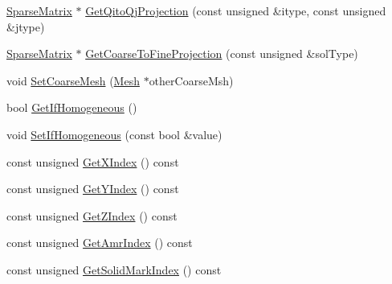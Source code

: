\begin{DoxyCompactItemize}
\item 
\mbox{\hyperlink{classfemus_1_1_sparse_matrix}{Sparse\+Matrix}} $\ast$ \mbox{\hyperlink{classfemus_1_1_mesh_a22a9673979ad78c09d562d9bb413cdde}{Get\+Qito\+Qj\+Projection}} (const unsigned \&itype, const unsigned \&jtype)
\item 
\mbox{\hyperlink{classfemus_1_1_sparse_matrix}{Sparse\+Matrix}} $\ast$ \mbox{\hyperlink{classfemus_1_1_mesh_adbe2f3cd24a35f80d8cd5adb2f5b82ac}{Get\+Coarse\+To\+Fine\+Projection}} (const unsigned \&sol\+Type)
\item 
void \mbox{\hyperlink{classfemus_1_1_mesh_a2a8172f3b7dff055b8a18fd093da3b74}{Set\+Coarse\+Mesh}} (\mbox{\hyperlink{classfemus_1_1_mesh}{Mesh}} $\ast$other\+Coarse\+Msh)
\item 
bool \mbox{\hyperlink{classfemus_1_1_mesh_abb0857c7d1bed5fa1a0ab54b090d4a00}{Get\+If\+Homogeneous}} ()
\item 
void \mbox{\hyperlink{classfemus_1_1_mesh_a6541fc0624c76cfac3f8fa417081d41f}{Set\+If\+Homogeneous}} (const bool \&value)
\item 
const unsigned \mbox{\hyperlink{classfemus_1_1_mesh_a5ce7f32c8ac5ab06d26e947998c8f7ca}{Get\+X\+Index}} () const
\item 
const unsigned \mbox{\hyperlink{classfemus_1_1_mesh_a21df1a22d607acbd3dadca81db8514e2}{Get\+Y\+Index}} () const
\item 
const unsigned \mbox{\hyperlink{classfemus_1_1_mesh_afee5b43f46dc87fe935039b237b7ee9f}{Get\+Z\+Index}} () const
\item 
const unsigned \mbox{\hyperlink{classfemus_1_1_mesh_a1038eadb501b8478a0da681e7040a10a}{Get\+Amr\+Index}} () const
\item 
const unsigned \mbox{\hyperlink{classfemus_1_1_mesh_af93502ef0cff075207cc259c90982fd9}{Get\+Solid\+Mark\+Index}} () const
\end{DoxyCompactItemize}
